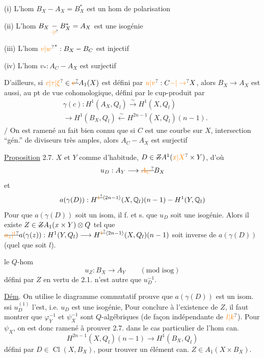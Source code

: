 (i) L'hom $B_X\mathbin{-}A_X=B_X^*$ est un hom de polarisation

(ii) L'hom $B_X\underset{\unsure{\cdot|\prime}}{\mathbin{-}}B_X^*=A_X$ est une isogénie

(iii) L'hom $\unsure{v|w}^*:B_X\mathbin{-}B_C$ est injectif 

(iv) L'hom $v_*:A_C\mathbin{-}A_X$ est surjectif

D'ailleurs, si $\unsure{c|\tau|\xi}\in\deleted{\unsure{v}}A_1(X)$ est défini par $\unsure{u|v}:C\unsure{\mathbin{-}|\to}X$, alors $B_X\to A_X$ est aussi, au pt de vue cohomologique, défini par le cup-produit par
\[
\begin{aligned}
&\gamma(c):H^1(A_X,Q_l)\xrightarrow{\sim}H^1(X,Q_l)\\
&\longrightarrow H^1(B_X,Q_l)\xleftarrow{\sim}H^{2n-1}(X,Q_l)(n-1).
\end{aligned}
\]
$/$ On est ramené au fait bien connu que si $C$ est une courbe sur $X$, intersection ``gén.'' de diviseurs très amples, alors $A_C\mathbin{-}A_X$ est surjectif

\uline{Proposition} 2.7. $X$ et $Y$ comme d'habitude, $D\in\deleted{Z}A^1(\unsure{x|X}\times Y)$, d'où
\[
u_D:A_Y\longrightarrow\deleted{\unsure{A_C}}B_X
\]
et
\[
a(\gamma(D)):H^{\deleted{\unsure{1}}\inserted{2n-1}}(X,\mathbb Q_l)(n-1)\mathbin{-}H^1(Y,\mathbb Q_l)
\]
Pour que $a(\gamma(D))$ soit un isom, il f. et s. que $u_D$ soit une isogénie. Alors il existe $Z\in\deleted{Z}A_1(x\times Y)\otimes Q$ tel que $\deleted{\unsure{a_z|{}^t}}a(\gamma(z)):H^1(Y,Q_l)\longrightarrow H^{\deleted{\unsure{1}}\inserted{2n-1}}(X,Q_l)(n-1)$ soit  inverse de $a(\gamma(D))$ (quel que soit $l$). 

 le $Q$-hom 
\[
u_Z:B_X\longrightarrow A_Y\qquad(\text{mod isog})
\]
défini par $Z$ en vertu de 2.1. n'est autre que $u_D^{-1}$.

\uline{Dém}. On utilise le diagramme commutatif
 prouve que $a(\gamma(D))$ est un isom. ssi $u_D^{(1)}$ l'est, i.e. $u_D$ est une isogénie, Pour conclure à l'existence de $Z$, il faut montrer que $\varphi_Y^{-1}$ et $\psi_X^{-1}$ sont $Q$-algébriques (de façon indépendante de $\unsure{l|k}$).  Pour $\psi_X$, on est donc ramené à prouver 2.7. dans le cas particulier de l'hom can.
\[
H^{2n-1}(X,Q_l)(n-1)\longrightarrow H^1(B_X,Q_l)
\]
défini par $D\in\operatorname{Cl}(X,B_X)$, pour trouver un élément can. $Z\in A_1(X\times B_X)$.

